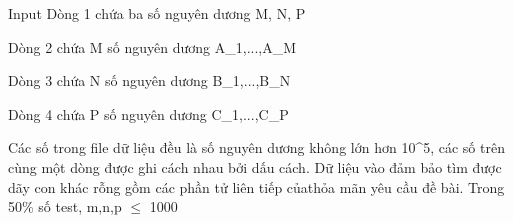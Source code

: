 Input
Dòng 1 chứa ba số nguyên dương M, N, P

Dòng 2 chứa M số nguyên dương A\_1,...,A\_M

Dòng 3 chứa N số nguyên dương B\_1,...,B\_N

Dòng 4 chứa P số nguyên dương C\_1,...,C\_P

Các số trong file dữ liệu đều là số nguyên dương không lớn hơn 10^5, các số trên cùng một dòng được ghi cách nhau bởi dấu cách. Dữ liệu vào đảm bảo tìm được dãy con khác rỗng gồm các phần tử liên tiếp củathỏa mãn yêu cầu đề bài. Trong 50\% số test, m,n,p  $\le$  1000